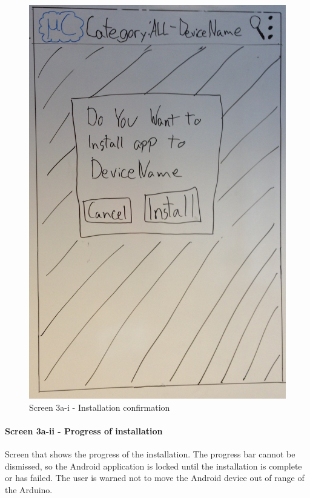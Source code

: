 \begin{figure}[H]
\centering
\includegraphics[scale=0.2]{images/Design_guide/Screen3a-i.png}
\caption{Screen 3a-i - Installation confirmation}
\label{fig:screen3ai}
\end{figure}


\paragraph{Screen 3a-ii - Progress of installation}
Screen that shows the progress of the installation. The progress bar cannot be dismissed, so the Android application is locked until the installation is complete or has failed.
The user is warned not to move the Android device out of range of the Arduino.

